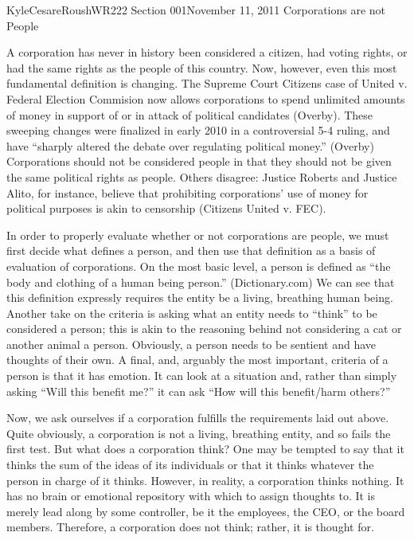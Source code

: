 \documentclass[12pt,letterpaper]{article}
\begin{document}
\begin{mla}{Kyle}{Cesare}{Roush}{WR222 Section 001}{November 11, 2011}{
Corporations are not People}

A corporation has never in history been considered a citizen, had voting rights,
or had the same rights as the people of this country.  Now, however, even this
most fundamental definition is changing.  The Supreme Court Citizens case of
United v. Federal Election Commision now allows corporations to spend unlimited
amounts of money in support of or in attack of political candidates (Overby).
These sweeping changes were finalized in early 2010 in a controversial 5-4
ruling, and have ``sharply altered the debate over regulating political money.''
(Overby) Corporations should not be considered people in that they should not be
given the same political rights as people.  Others disagree: Justice Roberts
and Justice Alito, for instance, believe that prohibiting corporations' use of
money for political purposes is akin to censorship (Citizens United v. FEC).

In order to properly evaluate whether or not corporations are people, we must
first decide what defines a person, and then use that definition as a basis of
evaluation of corporations.  On the most basic level, a person is defined as
``the body and clothing of a human being person.'' (Dictionary.com) We can see
that this definition expressly requires the entity be a living, breathing human
being.  Another take on the criteria is asking what an entity needs to ``think''
to be considered a person; this is akin to the reasoning behind not considering
a cat or another animal a person.  Obviously, a person needs to be sentient and
have thoughts of their own.  A final, and, arguably the most important, criteria
of a person is that it has emotion.  It can look at a situation and, rather than
simply asking ``Will this benefit me?'' it can ask ``How will this benefit/harm
others?''


Now, we ask ourselves if a corporation fulfills the requirements laid out above.
Quite obviously, a corporation is not a living, breathing entity, and so fails
the first test.  But what does a corporation think?  One may be tempted to say
that it thinks the sum of the ideas of its individuals or that it thinks
whatever the person in charge of it thinks.  However, in reality, a corporation
thinks nothing.  It has no brain or emotional repository with which to assign
thoughts to.  It is merely lead along by some controller, be it the employees,
the CEO, or the board members.  Therefore, a corporation does not think; rather,
it is thought for.


\end{mla}
\end{document}
